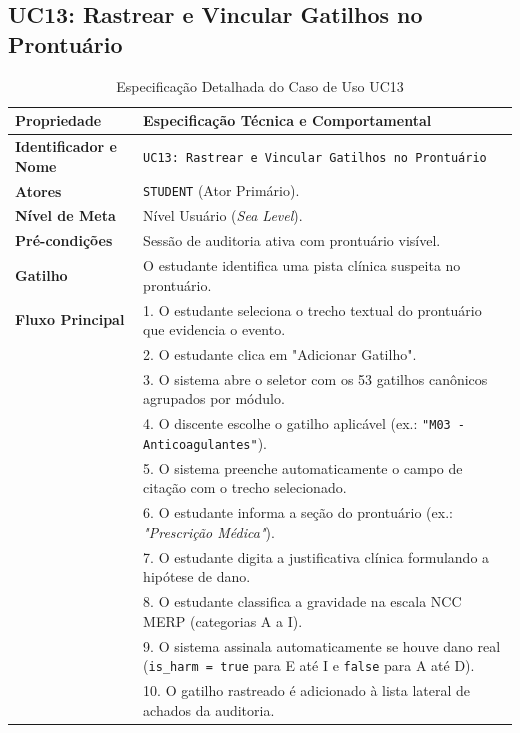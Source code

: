 \subsection{UC13: Rastrear e Vincular Gatilhos no Prontuário}
\label{uc13_especificacao}

\begin{table}[!ht]
\centering
\caption{Especificação Detalhada do Caso de Uso UC13}
\label{tab_uc13}
\footnotesize
\begin{tabularx}{\textwidth}{p{3.5cm} X}
\toprule
\textbf{Propriedade} & \textbf{Especificação Técnica e Comportamental} \\
\midrule
\textbf{Identificador e Nome} & \texttt{UC13: Rastrear e Vincular Gatilhos no Prontuário} \\
\textbf{Atores} & \texttt{STUDENT} (Ator Primário). \\
\textbf{Nível de Meta} & Nível Usuário (\textit{Sea Level}). \\
\textbf{Pré-condições} & Sessão de auditoria ativa com prontuário visível. \\
\textbf{Gatilho} & O estudante identifica uma pista clínica suspeita no prontuário. \\
\textbf{Fluxo Principal} & 
1. O estudante seleciona o trecho textual do prontuário que evidencia o evento.\\
& 2. O estudante clica em "Adicionar Gatilho".\\
& 3. O sistema abre o seletor com os 53 gatilhos canônicos agrupados por módulo.\\
& 4. O discente escolhe o gatilho aplicável (ex.: \texttt{"M03 - Anticoagulantes"}).\\
& 5. O sistema preenche automaticamente o campo de citação com o trecho selecionado.\\
& 6. O estudante informa a seção do prontuário (ex.: \textit{"Prescrição Médica"}).\\
& 7. O estudante digita a justificativa clínica formulando a hipótese de dano.\\
& 8. O estudante classifica a gravidade na escala NCC MERP (categorias A a I).\\
& 9. O sistema assinala automaticamente se houve dano real (\texttt{is\_harm = true} para E até I e \texttt{false} para A até D).\\
& 10. O gatilho rastreado é adicionado à lista lateral de achados da auditoria. \\

\end{tabularx}
\end{table}
